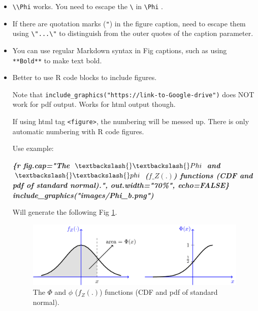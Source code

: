 \documentclass[
  a4paper,
  twoside,
  openright]{book}
\newenvironment{Shaded}{\begin{snugshade}}{\end{snugshade}}
\newcommand{\InformationTok}[1]{\textcolor[rgb]{0.56,0.35,0.01}{\textbf{\textit{#1}}}}
\theoremstyle{definition}
\theoremstyle{definition}
\theoremstyle{definition}
\theoremstyle{definition}
\theoremstyle{remark}
\begin{document}
\begin{itemize}
\item
  \texttt{\textbackslash{}\textbackslash{}Phi} works. You need to escape the \texttt{\textbackslash{}} in \texttt{\textbackslash{}Phi} .
\item
  If there are quotation marks (\texttt{"}) in the figure caption, need to escape them using \texttt{\textbackslash{}"...\textbackslash{}"} to distinguish from the outer quotes of the caption parameter.
\item
  You can use regular Markdown syntax in Fig captions, such as using \texttt{**Bold**} to make text bold.
\item
  {Better to use R code blocks to include figures.}

  Note that \texttt{include\_graphics("https://link-to-Google-drive")} {does NOT work for pdf output}. Works for html output though.

  If using html tag \texttt{\textless{}figure\textgreater{}}, the numbering will be messed up. There is only automatic numbering with R code figures.

  Use example:

\begin{Shaded}
\begin{Highlighting}[]
\InformationTok{\textasciigrave{}\textasciigrave{}\textasciigrave{}\{r fig.cap="The $\textbackslash{}\textbackslash{}Phi$ and $\textbackslash{}\textbackslash{}phi$ ($f\_Z(.)$) functions (CDF and pdf of standard normal).", out.width="70\%", echo=FALSE\}}
\InformationTok{include\_graphics("images/Phi\_b.png")}
\InformationTok{\textasciigrave{}\textasciigrave{}\textasciigrave{}}
\end{Highlighting}
\end{Shaded}

  Will generate the following Fig \ref{fig:fig1}.

  \begin{figure}
    \includegraphics[width=0.7\linewidth]{images/Phi_b} \caption{The $\Phi$ and $\phi$ ($f_Z(.)$) functions (CDF and pdf of standard normal).}\label{fig:fig1}
    \end{figure}
\end{itemize}
\end{document}
